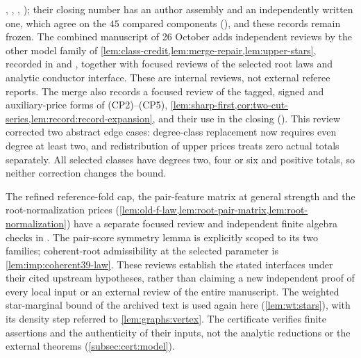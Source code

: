 ,
,
,
); their closing
number has an author assembly and an independently written one, which agree on
the $45$ compared components
(), and these records remain frozen. The combined manuscript of 26 October adds independent reviews by the other model family of
\cref{lem:class-credit,lem:merge-repair,lem:upper-stars}, recorded in
 and
, together with focused
reviews of the selected root laws and analytic conductor interface. These
are internal reviews, not external referee reports. The merge also records
a focused review of the tagged, signed and auxiliary-price forms of
(CP2)--(CP5), \cref{lem:sharp-first,cor:two-cut-series,lem:record:record-expansion},
and their use in the closing
(). This review corrected
two abstract edge cases: degree-class replacement now requires even degree
at least two, and redistribution of upper prices treats zero actual totals
separately. All selected classes have degrees two, four or six and positive
totals, so neither correction changes the bound.

The refined reference-fold cap, the pair-feature matrix at general strength
and the root-normalization prices
(\cref{lem:old-f-law,lem:root-pair-matrix,lem:root-normalization}) have a separate
focused review and independent finite algebra checks in
. The pair-score
symmetry lemma is explicitly scoped to its two families; coherent-root
admissibility at the selected parameter is
\cref{lem:imp:coherent39-law}. These reviews establish the stated interfaces
under their cited upstream hypotheses, rather than claiming a new
independent proof of every local input or an external review of the entire
manuscript. The weighted star-marginal bound of the archived text is used again here (\cref{lem:wt:stars}), with its density step referred to
\cref{lem:graphs:vertex}. The certificate verifies finite assertions and the
authenticity of their inputs, not the analytic reductions or the external
theorems (\cref{subsec:cert:model}).

